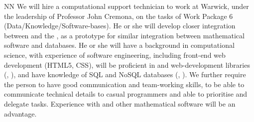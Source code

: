 \begin{participant}[type=R, PM=24]{NN}
  We will hire a computational support technician to work at Warwick,
  under the leadership of Professor John Cremona, on the tasks of Work
  Package 6 (Data/Knowledge/Software-bases).  He or she will develop
  closer integration between \Sage and the \LMFDB, as a prototype for
  similar integration between mathematical software and databases.  He
  or she will have a background in computational science, with
  experience of software engineering, including front-end web
  development (HTML5, CSS), will be proficient in \Python and
  web-development libraries (, ), 
  and have knowledge of SQL
  and NoSQL databases (, ). 
  We further require the person
  to have good communication and team-working skills, to be able to
  communicate technical details to casual programmers and able to
  prioritise and delegate tasks.  Experience with \Sage and other
  mathematical software will be an advantage.
\end{participant}
